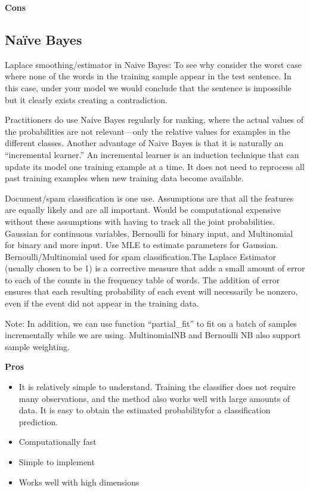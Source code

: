 \documentclass[]{book}
\begin{document}
\textbf{Cons}

\hypertarget{naive-bayes}{%
\subsection{Naïve Bayes}\label{naive-bayes}}

Laplace smoothing/estimator in Naive Bayes: To see why consider the worst case where none of the words in the training sample appear in the test sentence. In this case, under your model we would conclude that the sentence is impossible but it clearly exists creating a contradiction.

Practitioners do use Naive Bayes regularly for ranking, where the actual values of the probabilities are not relevant---only the relative values for examples in the different classes. Another advantage of Naive Bayes is that it is naturally an ``incremental learner.'' An incremental learner is an induction technique that can update its model one training example at a time. It does not need to reprocess all past training examples when new training data become available.

Document/spam classification is one use. Assumptions are that all the features are equally likely and are all important. Would be computational expensive without these assumptions with having to track all the joint probabilities. Gaussian for continuous variables, Bernoulli for binary input, and Multinomial for binary and more input. Use MLE to estimate parameters for Gaussian. Bernoulli/Multinomial used for spam classification.The Laplace Estimator (usually chosen to be 1) is a corrective measure that adds a small amount of error to each of the counts in the frequency table of words. The addition of error ensures that each resulting probability of each event will necessarily be nonzero, even if the event did not appear in the training data.

Note: In addition, we can use function ``partial\_fit'' to fit on a batch of samples incrementally while we are using. MultinomialNB and Bernoulli NB also support sample weighting.

\textbf{Pros}

\begin{itemize}
\item
  It is relatively simple to understand. Training the classifier does not require many observations, and the method also works well with large amounts of data. It is easy to obtain the estimated probabilityfor a classification prediction.
\item
  Computationally fast
\item
  Simple to implement
\item
  Works well with high dimensions
\end{itemize}
\end{document}
